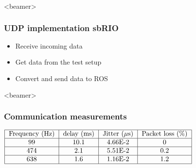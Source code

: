 \begin{frame}<beamer>
\frametitle{UDP implementation sbRIO}

\begin{itemize}
\item Receive incoming data 
\item Get data from the test setup 
\item Convert and send data to ROS
\end{itemize}

\end{frame}





\begin{frame}<beamer>
\frametitle{Communication measurements}
\begin{center}
  $\begin{tabular}{|c|c|c|c|c|}
    \hline
    \text{Frequency (Hz)} & \text{delay (ms)} & \text{Jitter ($\mu$s)} & \text{Packet loss (\%)}\\
    \hline
    99 & 10.1 & 4.66E-2 & 0 \\
    \hline
    474 & 2.1 & 5.51E-2 & 0.2 \\
    \hline
    638 & 1.6 & 1.16E-2 & 1.2 \\
    \hline
  \end{tabular}$
  \label{tab:new_protocol}
\end{center}
\end{frame}


